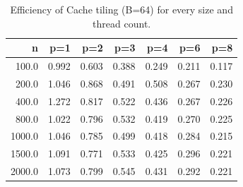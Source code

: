 \begin{table}[ht]
\centering
\small
\begin{tabular}{rrrrrrr}
\hline
n & p=1 & p=2 & p=3 & p=4 & p=6 & p=8 \\
\hline
100.0 & 0.992 & 0.603 & 0.388 & 0.249 & 0.211 & 0.117 \\
200.0 & 1.046 & 0.868 & 0.491 & 0.508 & 0.267 & 0.230 \\
400.0 & 1.272 & 0.817 & 0.522 & 0.436 & 0.267 & 0.226 \\
800.0 & 1.022 & 0.796 & 0.532 & 0.419 & 0.270 & 0.225 \\
1000.0 & 1.046 & 0.785 & 0.499 & 0.418 & 0.284 & 0.215 \\
1500.0 & 1.091 & 0.771 & 0.533 & 0.425 & 0.296 & 0.221 \\
2000.0 & 1.073 & 0.799 & 0.545 & 0.431 & 0.292 & 0.221 \\
\hline
\end{tabular}
\caption{Efficiency of Cache tiling (B=64) for every size and thread count.}
\label{tab:efficiency_all_sizes_tile}
\end{table}
